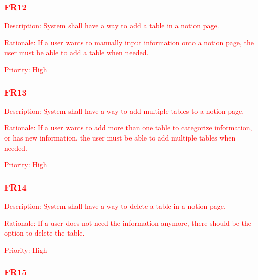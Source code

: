 \documentclass[12pt, titlepage]{article}
\begin{document}
\subsubsection{\textcolor{red}{FR12}}

\begin{description}
	\item \textcolor{red}{Description: System shall have a way to add a table in a notion page.}
	\item \textcolor{red}{Rationale: If a user wants to manually input information onto a notion page, the user must be able to add a table when needed.}
	\item \textcolor{red}{Priority: High}
\end{description}

\subsubsection{\textcolor{red}{FR13}}

\begin{description}
	\item \textcolor{red}{Description: System shall have a way to add multiple tables to a notion page.}
	\item \textcolor{red}{Rationale: If a user wants to add more than one table to categorize information, or has new information, the user must be able to add multiple tables when needed.}
	\item \textcolor{red}{Priority: High}
\end{description}

\subsubsection{\textcolor{red}{FR14}}

\begin{description}
	\item \textcolor{red}{Description: System shall have a way to delete a table in a notion page.}
	\item \textcolor{red}{Rationale: If a user does not need the information anymore, there should be the option to delete the table.}
	\item \textcolor{red}{Priority: High}
\end{description}

\subsubsection{\textcolor{red}{FR15}}
\end{document}
